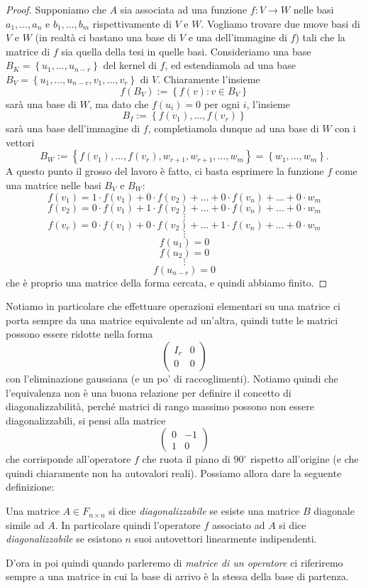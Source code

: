 \documentclass[11pt]{scrartcl}
\begin{document}
   	 \begin{proof}
   	 	Supponiamo che $A$ sia associata ad una funzione $f:V\to W$ nelle basi $a_1,\dots,a_n$ e $b_1,\dots, b_m$ rispettivamente di $V$ e $W$. Vogliamo trovare due nuove basi di $V$ e $W$ (in realtà ci bastano una base di $V$ e una dell'immagine di $f$) tali che la matrice di $f$ sia quella della tesi in quelle basi. Consideriamo una base $B_K=\left\{u_1,\dots,u_{n-r}\right\}$ del kernel di $f$, ed estendiamola ad una base $B_V=\left\{u_1,\dots,u_{n-r},v_1,\dots,v_r\right\}$ di $V$. Chiaramente l'insieme
   	 	$$f\left(B_V\right):=\left\{f(v):v\in B_V\right\}$$
   	 	sarà una base di $W$, ma dato che $f(u_i)=0$ per ogni $i$, l'insieme
   	 	$$B_I:=\left\{f(v_1),\dots,f(v_r)\right\}$$
   	 	sarà una base dell'immagine di $f$, completiamola dunque ad una base di $W$ con i vettori
   	 	$$B_W:=\left\{f(v_1),\dots,f(v_r),w_{r+1},w_{r+1},\dots,w_m\right\}=\left\{w_1,\dots,w_m\right\}.$$
   	 	A questo punto il grosso del lavoro è fatto, ci basta esprimere la funzione $f$ come una matrice nelle basi $B_V$ e $B_W$:
   	 	$$f(v_1)=1\cdot f(v_1)+0\cdot f(v_2)+\dots +0\cdot f(v_n)+\dots + 0\cdot w_m$$
   	 	$$f(v_2)=0\cdot f(v_1)+1\cdot f(v_2)+\dots +0\cdot f(v_n)+\dots + 0 \cdot w_m$$
   	 	$$\vdots$$
   	 	$$f(v_r)=0\cdot f(v_1)+0\cdot f(v_2)+\dots +1\cdot f(v_n)+\dots +0 \cdot w_m$$
   	 	$$\vdots$$
   	 	$$f(u_1)=0$$
   	 	$$f(u_2)=0$$
   	 	$$\vdots$$
   	 	$$f(u_{n-r})=0$$
   	 	che è proprio una matrice della forma cercata, e quindi abbiamo finito.
   	 \end{proof}
   	 Notiamo in particolare che effettuare operazioni elementari su una matrice ci porta sempre da una matrice equivalente ad un'altra, quindi tutte le matrici possono essere ridotte nella forma
   	 $$
   	 \left(
   	 \begin{array}{c|c}
   	 	I_r & 0 \\
   	 	\hline 
   	 	0 & 0
   	 \end{array}
   	 \right)
   	 $$
   	 con l'eliminazione gaussiana (e un po' di raccoglimenti). Notiamo quindi che l'equivalenza non è una buona relazione per definire il concetto di diagonalizzabilità, perché matrici di rango massimo possono non essere diagonalizzabili, si pensi alla matrice
   	 $$
   	 \begin{pmatrix}
   	 	0 & -1 \\
   	 	1 & 0
   	 \end{pmatrix}
   	 $$
   	 che corrisponde all'operatore $f$ che ruota il piano di $90^\circ$ rispetto all'origine (e che quindi chiaramente non ha autovalori reali). Possiamo allora dare la seguente definizione:
   	 \begin{definition}
   	 	Una matrice $A\in F_{n\times n}$ si dice \textit{diagonalizzabile} se esiste una matrice $B$ diagonale simile ad $A$. In particolare quindi l'operatore $f$ associato ad $A$ si dice \textit{diagonalizzabile} se esistono $n$ suoi autovettori linearmente indipendenti.
   	 \end{definition}
   	 D'ora in poi quindi quando parleremo di \textit{matrice di un operatore} ci riferiremo sempre a una matrice in cui la base di arrivo è la stessa della base di partenza.
\end{document}
